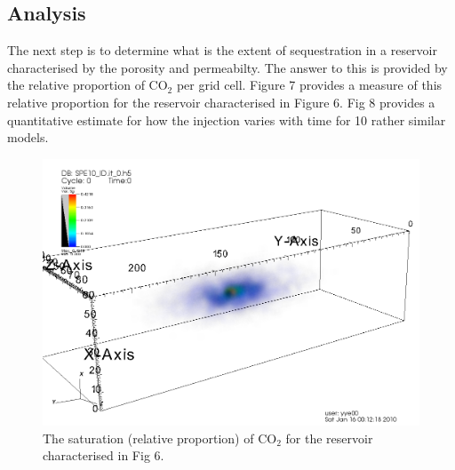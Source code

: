\documentclass{rspublic}
\begin{document}
\subsection{Analysis} 

The next step is to determine what is the extent of sequestration in a
reservoir characterised by the porosity and permeabilty.  The answer
to this is provided by the relative proportion of CO$_2$ per grid
cell. Figure 7 provides a measure of this relative proportion for the 
reservoir characterised in Figure 6. Fig 8 provides a quantitative
estimate for how the injection varies with time for 10 rather similar
models. 

\begin{figure}
\begin{center}
\includegraphics[scale=0.3]{figures/visit0001.png} 
\end{center}
\caption[Simulation Output]{The saturation (relative proportion) of
  CO$_2$ for the reservoir characterised in Fig 6.}
\label{}
\end{figure}
\end{document}
